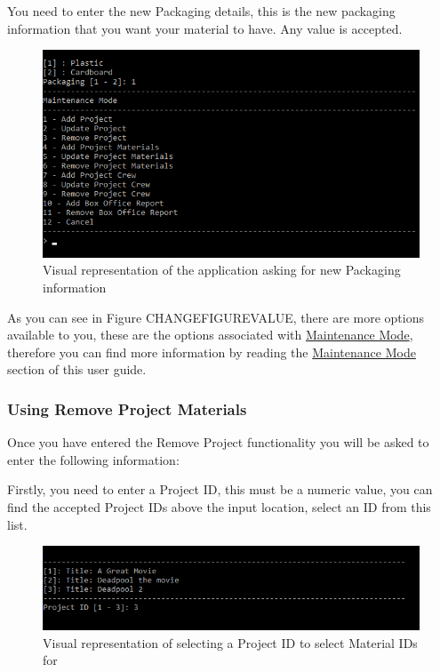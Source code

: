\documentclass[
  english,
  a4paper,
,tablecaptionabove
]{scrartcl}
\begin{document}
You need to enter the new Packaging details, this is the new packaging
information that you want your material to have. Any value is accepted.

\begin{figure}
\centering
\includegraphics{images/user-guide/maintenance-mode/update-project-material-packaging.png}
\caption{Visual representation of the application asking for new
Packaging information}
\end{figure}

As you can see in Figure CHANGEFIGUREVALUE, there are more options
available to you, these are the options associated with
\protect\hyperlink{using-maintenance-mode}{Maintenance Mode}, therefore
you can find more information by reading the
\protect\hyperlink{using-maintenance-mode}{Maintenance Mode} section of
this user guide.

\newpage

\hypertarget{using-remove-project-materials}{%
\subsubsection{Using Remove Project
Materials}\label{using-remove-project-materials}}

Once you have entered the Remove Project functionality you will be asked
to enter the following information:

Firstly, you need to enter a Project ID, this must be a numeric value,
you can find the accepted Project IDs above the input location, select
an ID from this list.

\begin{figure}
\centering
\includegraphics{images/user-guide/maintenance-mode/remove-project-select-id.png}
\caption{Visual representation of selecting a Project ID to select
Material IDs for}
\end{figure}
\end{document}
